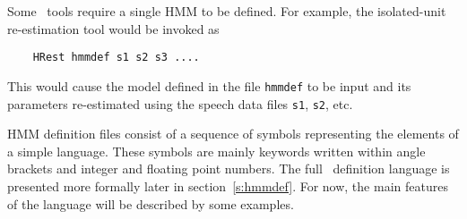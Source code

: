 
Some \HTK\ tools require a single HMM to be defined.  For example, the
isolated-unit re-estimation tool  would be invoked as
\begin{verbatim}
    HRest hmmdef s1 s2 s3 ....
\end{verbatim}

\noindent
This would cause the model defined in the file \texttt{hmmdef}
to be input and its parameters re-estimated using the speech data
files \texttt{s1}, \texttt{s2}, etc.

HMM definition files consist of a sequence of symbols representing
the elements of a simple language.  These symbols are mainly
keywords written within angle brackets and integer and
floating point numbers. 
The full \HTK\ definition language is presented
more formally later in section~\ref{s:hmmdef}.  For now, the
main features of the language will be described by some
examples.


